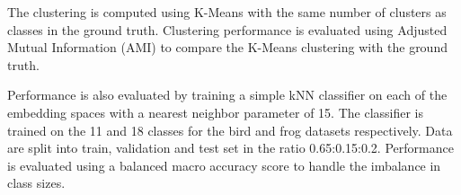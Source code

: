 
The clustering is computed using K-Means with the same number of clusters as classes in the ground truth. 
Clustering performance is evaluated using Adjusted Mutual Information (AMI) \cite{romano_standardized_2014} to compare the K-Means clustering with the ground truth.

Performance is also evaluated by training a simple kNN classifier on each of the embedding spaces with a nearest neighbor parameter of 15.
The classifier is trained on the 11 and 18 classes for the bird and frog datasets respectively.
Data are split into train, validation and test set in the ratio 0.65:0.15:0.2.
Performance is evaluated using a balanced macro accuracy score \cite{brodersen_balanced_2010} to handle the imbalance in class sizes.

